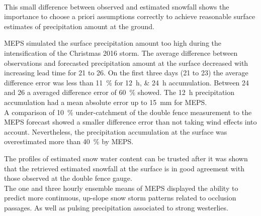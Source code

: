\\
This small difference between observed and estimated snowfall shows the importance to choose a priori assumptions correctly to achieve reasonable surface estimates of precipitation amount at the ground.
\par\medskip
\noindent
MEPS simulated the surface precipitation amount too high during the intensification of the Christmas 2016 storm. 
The average difference between observations and forecasted precipitation amount at the surface decreased with increasing lead time for \num{21} to \SI{26}{\dec}.
On the first three days (\num{21} to \SI{23}{\dec}) the average difference error was less than \SI{11}{\percent} for \SIlist{12;24}{\hour} accumulation.
Between \num{24} and \SI{26}{\dec} a averaged difference error of \SI{60}{\percent} showed.
The \SI{12}{\hour} precipitation accumulation had a mean absolute error up to \SI{15}{\mm} for MEPS. %
\\
A comparison of \SI{10}{\percent} under-catchment of the double fence measurement to the MEPS forecast showed a smaller difference error than not taking wind effects into account.
Nevertheless, the precipitation accumulation at the surface was overestimated more than \SI{40}{\percent} by MEPS. %
\par\medskip
\noindent
The profiles of estimated snow water content can be trusted after it was shown that the retrieved estimated snowfall at the surface is in good agreement with those observed at the double fence gauge.
\\
The one and three hourly ensemble means of MEPS displayed the ability to predict more continuous, up-slope snow storm patterns related to occlusion passages. As well as pulsing precipitation associated to strong westerlies.
